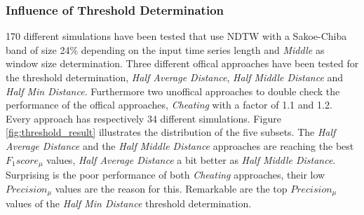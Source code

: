 \subsubsection{Influence of Threshold Determination} \label{influence_of_threshold_determination}
170 different simulations have been tested that use NDTW with a Sakoe-Chiba band of size 24\% depending on the input
time series length and \textit{Middle} as window size determination. Three different offical approaches have been tested
for the threshold determination, \textit{Half Average Distance}, \textit{Half Middle Distance} and
\textit{Half Min Distance}. Furthermore two unoffical approaches to double check the performance of the offical
approaches, \textit{Cheating} with a factor of 1.1 and 1.2. Every approach has respectively 34 different simulations.
Figure \ref{fig:threshold_result} illustrates the distribution of the five subsets. The \textit{Half Average Distance}
and the \textit{Half Middle Distance} approaches are reaching the best $F_{1}score_{\mu}$ values,
\textit{Half Average Distance} a bit better as \textit{Half Middle Distance}. Surprising is the poor performance of both
\textit{Cheating} approaches, their low $Precision_{\mu}$ values are the reason for this. Remarkable are the top
$Precision_{\mu}$ values of the \textit{Half Min Distance} threshold determination.

